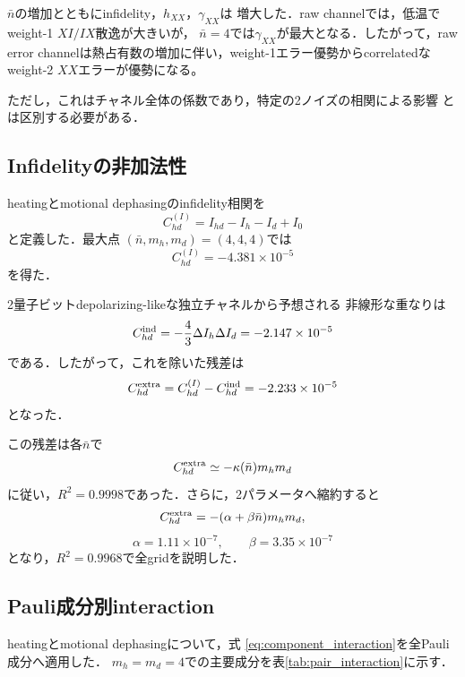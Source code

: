 \documentclass[dvipdfmx,a4paper,10pt,twocolumn]{jsarticle}
\begin{document}
$\bar n$の増加とともにinfidelity，$h_{XX}$，$\gamma_{XX}$は
増大した．raw channelでは，低温でweight-1 $XI/IX$散逸が大きいが，
$\bar n=4$では$\gamma_{XX}$が最大となる．したがって，raw error
channelは熱占有数の増加に伴い，weight-1エラー優勢からcorrelatedな
weight-2 $XX$エラーが優勢になる。

ただし，これはチャネル全体の係数であり，特定の2ノイズの相関による影響
とは区別する必要がある．

\subsection{Infidelityの非加法性}

heatingとmotional dephasingのinfidelity相関を
\begin{equation}
 C_{hd}^{(I)}
 =
 I_{hd}-I_h-I_d+I_0
\end{equation}
と定義した．最大点
$(\bar n,m_h,m_d)=(4,4,4)$では
\begin{equation}
 C_{hd}^{(I)}=-4.381\times10^{-5}
\end{equation}
を得た．

2量子ビットdepolarizing-likeな独立チャネルから予想される
非線形な重なりは
\begin{equation}
 C_{hd}^{\rm ind}
 =
 -\frac{4}{3}\Delta I_h\Delta I_d
 =
 -2.147\times10^{-5}
\end{equation}
である．したがって，これを除いた残差は
\begin{equation}
 C_{hd}^{\rm extra}
 =
 C_{hd}^{(I)}-C_{hd}^{\rm ind}
 =
 -2.233\times10^{-5}
\end{equation}
となった．

この残差は各$\bar n$で
\begin{equation}
 C_{hd}^{\rm extra}
 \simeq-\kappa(\bar n)m_hm_d
 \label{eq:rate_product}
\end{equation}
に従い，$R^2=0.9998$であった．さらに，2パラメータへ縮約すると
\begin{equation}
 C_{hd}^{\rm extra}
 =
 -(\alpha+\beta\bar n)m_hm_d ,
 \label{eq:thermal_model}
\end{equation}
\[
 \alpha=1.11\times10^{-7},\qquad
 \beta=3.35\times10^{-7}
\]
となり，$R^2=0.9968$で全gridを説明した．

\subsection{Pauli成分別interaction}

heatingとmotional dephasingについて，式
\eqref{eq:component_interaction}を全Pauli成分へ適用した．
$m_h=m_d=4$での主要成分を表\ref{tab:pair_interaction}に示す．
\end{document}
